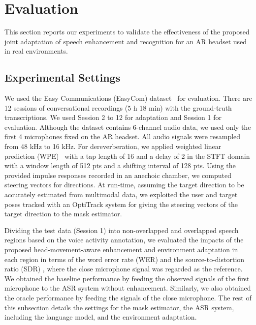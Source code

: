 \documentclass[a4paper]{article}
\begin{document}
\section{Evaluation}
\label{sec:evaluation}

This section reports our experiments
to validate the effectiveness of
the proposed joint adaptation of speech enhancement and recognition for an AR headset used in real environments.

\subsection{Experimental Settings} \label{sec:exp_settings}

We used the Easy Communications (EasyCom) dataset~\cite{donley2021easycom} for evaluation.
There are 12 sessions of conversational recordings (5 h 18 min)
 with the ground-truth transcriptions.
We used Session 2 to 12 for adaptation 
 and Session 1 for evaluation.
Although the dataset contains 6-channel audio data,
 we used only the first 4 microphones fixed on the AR headset.
All audio signals were resampled from 48 kHz to 16 kHz.
For dereverberation,
 we applied weighted linear prediction (WPE)~\cite{yoshioka_generalization_2012} 
 with a tap length of 16 and a delay of 2 in the STFT domain with a window length of 512 pts and a shifting interval of 128 pts.
Using the provided impulse responses recorded in an anechoic chamber,
 we computed steering vectors for  directions. 
At run-time, assuming the target direction to be accurately estimated from multimodal data,
 we exploited the user and target poses tracked with an OptiTrack system
 for giving the steering vectors of the target direction
 to the mask estimator.

Dividing the test data (Session 1) into non-overlapped and overlapped speech regions
 based on the voice activity annotation,
 we evaluated the impacts of the proposed head-movement-aware enhancement and environment adaptation
 in each region in terms of
 the word error rate (WER) and
 the source-to-distortion ratio (SDR) \cite{vincent_performance_2006},
 where the close microphone signal was regarded as the reference.
We obtained the baseline performance 
 by feeding the observed signals of the first microphone to the ASR system without enhancement.
Similarly, we also obtained the oracle performance 
 by feeding the signals of the close microphone.
The rest of this subsection details the settings for the mask estimator, 
 the ASR system, including the language model, and the environment adaptation.
\end{document}
